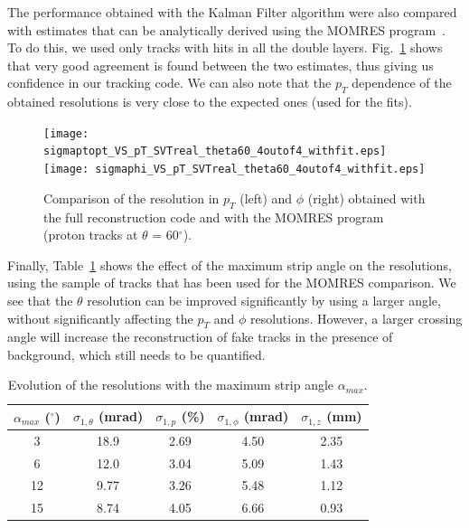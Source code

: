 The performance obtained with the Kalman Filter algorithm were also compared with 
estimates that can be analytically derived using the MOMRES program~\cite{momres}. 
To do this, we used only tracks with hits in all the double layers. 
Fig.~\ref{sec_central:pic_momrescomparison} shows that very good agreement is found 
between the two estimates, thus giving us confidence in our tracking code.  We can 
also note that the $p_T$ dependence of the obtained resolutions is very close to the 
expected ones (used for the fits).

\begin{figure}[ht!]
\centering
\texttt{[image: sigmaptopt\_VS\_pT\_SVTreal\_theta60\_4outof4\_withfit.eps]}
\texttt{[image: sigmaphi\_VS\_pT\_SVTreal\_theta60\_4outof4\_withfit.eps]}
\caption{\small{Comparison of the resolution in $p_T$ (left) and $\phi$ (right) 
obtained with the full reconstruction code and with the MOMRES program (proton tracks 
at $\theta$ = 60$^\circ$).}}
\label{sec_central:pic_momrescomparison}
\end{figure}

Finally, Table~\ref{sec_central:table_resolangle} shows the effect of the maximum 
strip angle on the resolutions, using the sample of tracks that has been used for 
the MOMRES comparison.  We see that the $\theta$ resolution can be improved 
significantly by using a larger angle, without significantly affecting the $p_T$ and 
$\phi$ resolutions.  However, a larger crossing angle will increase the 
reconstruction of fake tracks in the presence of background, which still needs to be 
quantified.

\begin{table}[ht!]
\centering
\begin{tabular}{|c|c|c|c|c|} \hline
$\alpha_{max}$ ($^{\circ}$) & $\sigma_{1,\theta}$ (mrad) & $\sigma_{1,p}$ (\%) & $\sigma_{1,\phi}$ (mrad) & $\sigma_{1,z}$ (mm)  \\ \hline
3    & 18.9   &  2.69  &    4.50   &  2.35  \\
6    & 12.0   &  3.04  &    5.09   &  1.43  \\
12   & 9.77   &  3.26  &    5.48   &  1.12  \\
15   & 8.74   &  4.05  &    6.66   &  0.93  \\ \hline
\end{tabular}
\caption{\small{Evolution of the resolutions with the maximum strip angle 
$\alpha_{max}$.}}
\label{sec_central:table_resolangle}
\end{table}

